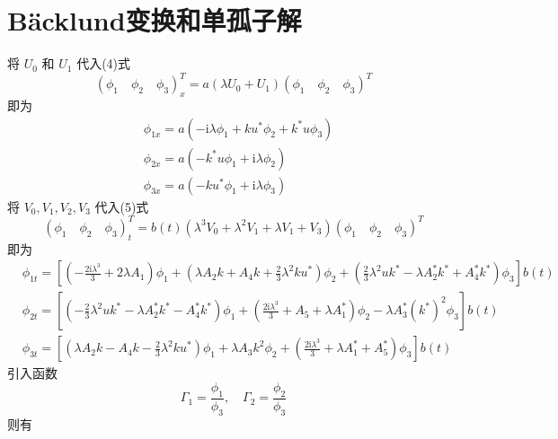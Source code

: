 \section{B\"acklund变换和单孤子解}
将 $U_{0}$ 和 $U_{1}$ 代入(4)式
\begin{equation}
  (\phi_{1}\quad \phi_{2}\quad \phi_{3})_{x}^{T} = a(\lambda U_{0} + U_{1})(\phi_{1}\quad \phi_{2}\quad \phi_{3})^{T}
\end{equation}
即为
\begin{align}
  & \phi_{1x} = a(-\mathrm{i}\lambda\phi_{1} + ku^{*}\phi_{2} +k^{*}u\phi_{3}) \\
  & \phi_{2x} = a(-k^{*}u\phi_{1} + \mathrm{i}\lambda\phi_{2}) \\
  & \phi_{3x} = a(-ku^{*}\phi_{1} + \mathrm{i}\lambda\phi_{3})
\end{align}
将 $V_{0}, V_{1}, V_{2}, V_{3}$ 代入(5)式
\begin{equation}
  (\phi_{1}\quad \phi_{2} \quad \phi_{3})^{T}_{t} = b(t)(\lambda^{3}V_{0} + \lambda^{2}V_{1} + \lambda V_{1} + V_{3})(\phi_{1}\quad \phi_{2} \quad \phi_{3})^{T}
\end{equation}
即为
\begin{align}
  & \phi_{1t} = \left[\left(-\frac{2\mathrm{i}\lambda^{3}}{3}+2\lambda A_{1}\right)\phi_{1} + \left(\lambda A_{2}k+A_{4}k+\frac{2}{3}\lambda^{2}ku^{*}\right)\phi_{2} + \left(\frac{2}{3}\lambda^{2}uk^{*}-\lambda A_{2}^{*}k^{*}+A_{4}^{*}k^{*}\right)\phi_{3}\right]b(t) \\
  & \phi_{2t} = \left[\left(-\frac{2}{3}\lambda^{2}uk^{*}-\lambda A_{2}^{*}k^{*}-A_{4}^{*}k^{*}\right)\phi_{1} + \left(\frac{2\mathrm{i}\lambda^{3}}{3}+A_{5}+\lambda A_{1}^{*}\right)\phi_{2} - \lambda A_{3}^{*}(k^{*})^{2}\phi_{3}\right]b(t) \\
  & \phi_{3t} = \left[\left(\lambda A_{2}k-A_{4}k-\frac{2}{3}\lambda^{2}ku^{*}\right)\phi_{1} + \lambda A_{3}k^{2}\phi_{2} + \left(\frac{2\mathrm{i}\lambda^{3}}{3}+\lambda A_{1}^{*} + A_{5}^{*}\right)\phi_{3}\right]b(t)
\end{align}
引入函数
\begin{equation}
  \Gamma_{1} = \frac{\phi_{1}}{\phi_{3}}, \quad \Gamma_{2} = \frac{\phi_{2}}{\phi_{3}}
\end{equation}
则有
